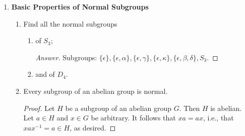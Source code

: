 \documentclass[../notes.tex]{subfiles}
\begin{document}
\begin{enumerate}[label={\textbf{\Alph*.}}]
\begin{enumerate}
        \item For any group $G$, the function $f:G\to G$ defined by $f(x)=e$ is a homomorphism.
        \item For any group $G$, $\{e\}$ and $G$ are homomorphic images of $G$.
        \item The function $f:G\to G$ defined by $f(x)=x^2$ is a homomorphism iff $G$ is abelian.
        \begin{proof}
            Suppose first that $f(x)=x^2$ is a homomorphism. Let $x,y\in G$ be arbitrary. Then $xyxy=(xy)^2=f(xy)=f(x)f(y)=x^2y^2=xxyy$. It follows by consecutive applications of the cancellation law that $yx=xy$, proving that $G$ is abelian, as desired.\par
            Now suppose that $G$ is abelian. Let $x,y\in G$ be arbitrary. Then $xy=yx$. It follows that $xxyy=xyxy$. But this implies that $f(x)f(y)=xxyy=xyxy=f(xy)$, as desired.
        \end{proof}
        \item The functions $f_1(x,y)=x$ and $f_2(x,y)=y$ from $G\times H$ to $G$ and $H$, respectively, are homomorphisms.
        \begin{proof}
            $f_1[(x,y)(x',y')]=f_1(xx',yy')=xx'=f_1(x,y)f(x',y')$, as desired.\par
            Symmetric for $f_2$.
        \end{proof}
    \end{enumerate}
    \item {}\textbf{Basic Properties of Normal Subgroups}
    \begin{enumerate}
        \item Find all the normal subgroups
        \begin{enumerate}[label={(\alph*)}]
            \item of $S_3$;
            \begin{proof}[Answer]
                Subgroups: $\{\epsilon\},\{\epsilon,\alpha\},\{\epsilon,\gamma\},\{\epsilon,\kappa\},\{\epsilon,\beta,\delta\},S_3$.
            \end{proof}
            \item and of $D_4$.
        \end{enumerate}
        \item Every subgroup of an abelian group is normal.
        \begin{proof}
            Let $H$ be a subgroup of an abelian group $G$. Then $H$ is abelian. Let $a\in H$ and $x\in G$ be arbitrary. It follows that $xa=ax$, i.e., that $xax^{-1}=a\in H$, as desired.

\end{proof}
\end{enumerate}
\end{enumerate}
\end{document}
